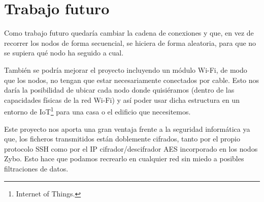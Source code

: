 \section{Trabajo futuro}
Como trabajo futuro quedaría cambiar la cadena de conexiones y que, en vez de recorrer los nodos de forma secuencial, se hiciera de forma aleatoria, para que no se supiera qué nodo ha seguido a cual.

También se podría mejorar el proyecto incluyendo un módulo Wi-Fi, de modo que los nodos, no tengan que estar necesariamente conectados por cable. Esto nos daría la posibilidad de ubicar cada nodo donde quisiéramos (dentro de las capacidades físicas de la red Wi-Fi) y así poder usar dicha estructura en un entorno de IoT\footnote{Internet of Things.} para una casa o el edificio que necesitemos.

Este proyecto nos aporta una gran ventaja frente a la seguridad informática ya que, los ficheros transmitidos están doblemente cifrados, tanto por el propio protocolo SSH como por el IP cifrador/descifrador AES incorporado en los nodos Zybo. Esto hace que podamos recrearlo en cualquier red sin miedo a posibles filtraciones de datos.